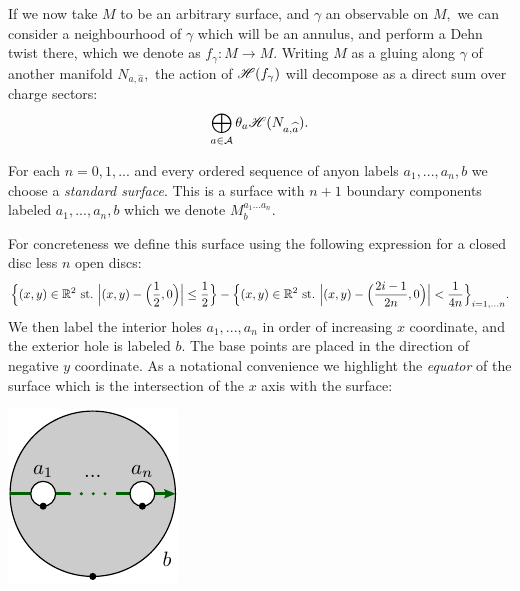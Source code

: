 \documentclass[aps, tightenlines, letterpaper, onecolumn, superscriptaddress, notitlepage, 11pt, groupedaddress]{revtex4-1}
\begin{document}
If we now take $M$ to be an arbitrary surface, and $\gamma$ an
observable on $M,$ we can consider a neighbourhood of $\gamma$
which will be an annulus, and perform a Dehn twist there,
which we denote as $f_\gamma : M\to M.$
Writing $M$ as a gluing along $\gamma$ of another
manifold $N_{a,\widehat{a}},$
the action of $\mathscr{H}(f_\gamma)$ will decompose as a direct sum over charge 
sectors:
$$
\bigoplus_{a\in\mathcal{A}} \theta_a \mathscr{H}(N_{a,\widehat{a}}).
$$

\newcommand{\StdM}{M^{a_1...a_n}_{b}}

For each $n=0,1,...$ and every ordered sequence of
anyon labels $a_1,...,a_n,b$ we choose a \emph{standard surface}.
This is a surface with
$n+1$ boundary components labeled $a_1,...,a_n,{b}$ 
which we denote $\StdM.$ 

For concreteness
we define this surface using the following 
expression for a closed disc less $n$ open discs:
$$
\Bigl\{(x,y)\in\R^2 \ \mathrm{st.}\  \Bigl|(x,y)-\Bigl(\frac{1}{2},0\Bigr)\Bigr|\le \frac{1}{2}\Bigr\} -
\Bigl\{(x,y)\in\R^2 \ \mathrm{st.}\  \Bigl|(x,y)-\Bigl(\frac{2i-1}{2n},0\Bigr)\Bigr| < \frac{1}{4n}\Bigr\}_{i=1,...n}.
$$
We then label the interior holes $a_1,...,a_n$ in order of
increasing $x$ coordinate, and the exterior hole is labeled $b$.
The base points are placed in the direction of negative $y$ coordinate.
As a notational convenience we highlight the \emph{equator}
of the surface %
which is the intersection of
the $x$ axis with the surface:
\begin{center}
\includegraphics[]{pic-disc-standard.pdf}
\end{center}
\end{document}
